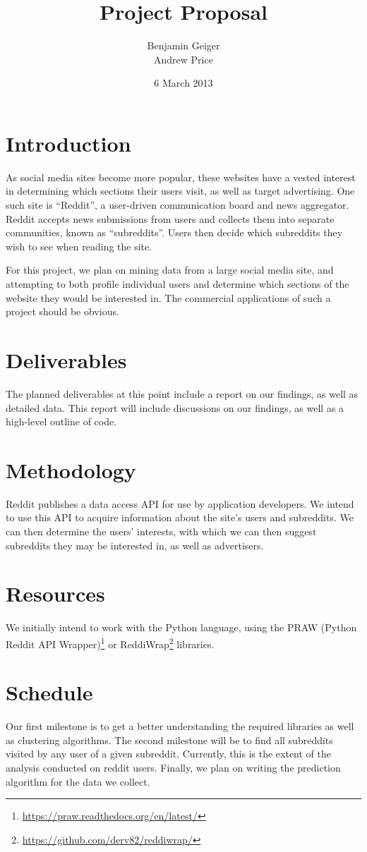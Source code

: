 \documentclass{article}
\title{Project Proposal}
\author{Benjamin Geiger\\
Andrew Price}
\date{6 March 2013}
\begin{document}
\maketitle

\section{Introduction}

As social media sites become more popular, these websites have a vested
interest in determining which sections their users visit, as well as
target advertising. One such site is ``Reddit'', a user-driven
communication board and news aggregator. Reddit accepts news submissions
from users and collects them into separate communities, known as
``subreddits''. Users then decide which subreddits they wish to see when
reading the site.

For this project, we plan on mining data from a large social media site,
and attempting to both profile individual users and determine which
sections of the website they would be interested in. The commercial
applications of such a project should be obvious.

\section{Deliverables}

The planned deliverables at this point include a report on our findings,
as well as detailed data. This report will include discussions on our
findings, as well as a high-level outline of code.

\section{Methodology}

Reddit publishes a data access API for use by application developers. We
intend to use this API to acquire information about the site's users and
subreddits. We can then determine the users' interests, with which we
can then suggest subreddits they may be interested in, as well as
advertisers.

\section{Resources}

We initially intend to work with the Python language, using the PRAW
(Python Reddit API
Wrapper)\footnote{\url{https://praw.readthedocs.org/en/latest/}} or
ReddiWrap\footnote{\url{https://github.com/derv82/reddiwrap/}}
libraries.

\section{Schedule}

Our first milestone is to get a better understanding the required
libraries as well as clustering algorithms. The second milestone will be
to find all subreddits visited by any user of a given subreddit.
Currently, this is the extent of the analysis conducted on reddit users.
Finally, we plan on writing the prediction algorithm for the data we
collect.

\nocite{*}


\end{document}
